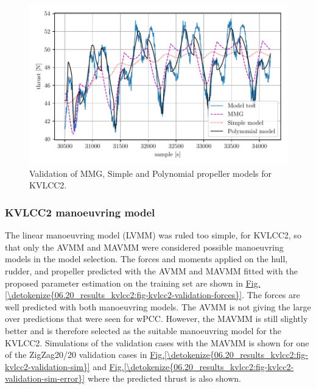 \begin{figure}[!htb]
\centering
\includegraphics{kappa/images/12.pdf}
\caption{Validation of MMG, Simple and Polynomial propeller models for KVLCC2.}\label{\detokenize{06.20_results_kvlcc2:fig-propeller-validation}}\end{figure}


\subsubsection{KVLCC2 manoeuvring model}
\label{\detokenize{06.20_results_kvlcc2:kvlcc2-manoeuvring-model}}

The linear manoeuvring model (LVMM) was ruled too simple, for KVLCC2, so that only the AVMM and MAVMM were considered possible manoeuvring models in the model selection.
The forces and moments applied on the hull, rudder, and propeller predicted with the AVMM and MAVMM fitted with the proposed parameter estimation on the training set are shown in \hyperref[\detokenize{06.20_results_kvlcc2:fig-kvlcc2-validation-forces}]{Fig.\@ \ref{\detokenize{06.20_results_kvlcc2:fig-kvlcc2-validation-forces}}}.
The forces are well predicted with both manoeuvring models. The AVMM is not giving the large over predictions that were seen for wPCC. However, the MAVMM is still slightly better and is therefore selected as the suitable manoeuvring model for the KVLCC2.
Simulations of the validation cases with the MAVMM is shown for one of the ZigZag20/20 validation cases in \hyperref[\detokenize{06.20_results_kvlcc2:fig-kvlcc2-validation-sim}]{Fig.\@ \ref{\detokenize{06.20_results_kvlcc2:fig-kvlcc2-validation-sim}}} and \hyperref[\detokenize{06.20_results_kvlcc2:fig-kvlcc2-validation-sim-error}]{Fig.\@ \ref{\detokenize{06.20_results_kvlcc2:fig-kvlcc2-validation-sim-error}}} where the predicted thrust is also shown.

